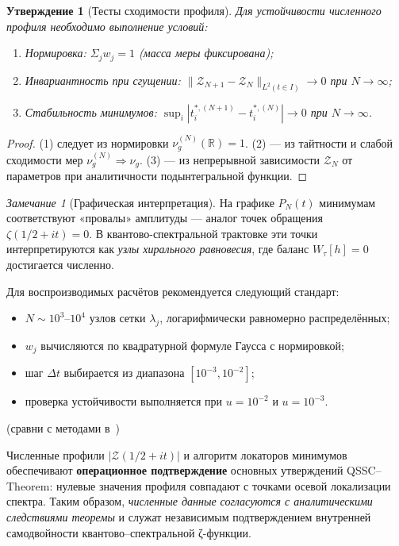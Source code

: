 \documentclass{article}
\numberwithin{equation}{section}
\theoremstyle{plain}
\newtheorem{proposition}{Утверждение}
\theoremstyle{definition}
\theoremstyle{remark}
\newtheorem*{remark}{Замечание}
\def\Rightarrow{⇒}%
\def\infty{∞}\def\partial{∂}\def\sum{Σ}\def\int{∫}%
\begin{document}
\begin{proposition}[Тесты сходимости профиля]
\label{prop:convtests}
Для устойчивости численного профиля необходимо выполнение условий:
\begin{enumerate}
\item \emph{Нормировка:} $\sum_j w_j = 1$ (масса меры фиксирована);
\item \emph{Инвариантность при сгущении:} $\|\mathcal Z_{N+1}-\mathcal Z_N\|_{L^2(t\in I)}\to0$ при $N\to\infty$;
\item \emph{Стабильность минимумов:} 
$\sup_i|t_i^{\ast,(N+1)}-t_i^{\ast,(N)}|\to0$ при $N\to\infty$.
\end{enumerate}
\end{proposition}

\begin{proof}
(1) следует из нормировки $\nu_g^{(N)}(\mathbb R)=1$.  
(2) — из тайтности и слабой сходимости мер $\nu_g^{(N)}\Rightarrow\nu_g$.  
(3) — из непрерывной зависимости $\mathcal Z_N$ от параметров при аналитичности подынтегральной функции.
\end{proof}

\begin{remark}[Графическая интерпретация]
На графике $P_N(t)$ минимумам соответствуют «провалы» амплитуды — 
аналог точек обращения $\zeta(1/2+it)=0$.  
В квантово-спектральной трактовке эти точки интерпретируются как \emph{узлы хирального равновесия},
где баланс $W_\tau[h]=0$ достигается численно.
\end{remark}

\noindent
Для воспроизводимых расчётов рекомендуется следующий стандарт:

\begin{itemize}
\item $N \sim 10^3$–$10^4$ узлов сетки $\lambda_j$, логарифмически равномерно распределённых;
\item $w_j$ вычисляются по квадратурной формуле Гаусса с нормировкой;
\item шаг $\Delta t$ выбирается из диапазона $[10^{-3},10^{-2}]$;
\item проверка устойчивости выполняется при $u=10^{-2}$ и $u=10^{-3}$.
\end{itemize}
(сравни с методами в~\cite{Gourdon2004})

\noindent
Численные профили $|\mathcal Z(1/2+it)|$ 
и алгоритм локаторов минимумов обеспечивают \textbf{операционное подтверждение}
основных утверждений QSSC–Theorem:  
нулевые значения профиля совпадают с точками осевой локализации спектра.  
Таким образом, \emph{численные данные согласуются с аналитическими следствиями теоремы}
и служат независимым подтверждением внутренней самодвойности квантово–спектральной ζ-функции.
\end{document}
